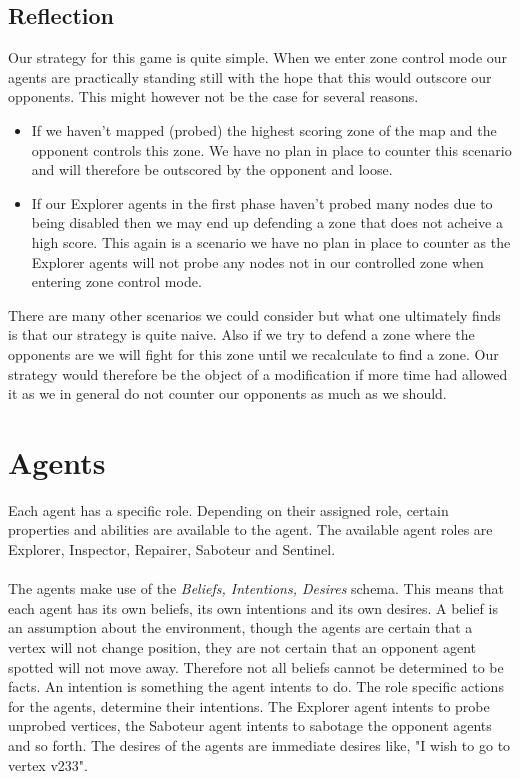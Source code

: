 \documentclass[11pt]{article}
\begin{document}
\subsection{Reflection}
Our strategy for this game is quite simple. When we enter zone control mode our agents are practically standing still with the hope that this would outscore our opponents. This might however not be the case for several reasons.
\begin{itemize}
\item If we haven't mapped (probed) the highest scoring zone of the map and the opponent controls this zone. We have no plan in place to counter this scenario and will therefore be outscored by the opponent and loose.
\item If our Explorer agents in the first phase haven't probed many nodes due to being disabled then we may end up defending a zone that does not acheive a high score. This again is a scenario we have no plan in place to counter as the Explorer agents will not probe any nodes not in our controlled zone when entering zone control mode.
\end{itemize}
There are many other scenarios we could consider but what one ultimately finds is that our strategy is quite naive. Also if we try to defend a zone where the opponents are we will fight for this zone until we recalculate to find a zone. Our strategy would therefore be the object of a modification if more time had allowed it as we in general do not counter our opponents as much as we should.

\section{Agents}
Each agent has a specific role. Depending on their assigned role, certain properties and abilities are available to the agent. The available agent roles are Explorer, Inspector, Repairer, Saboteur and Sentinel.\\
\\
The agents make use of the \emph{Beliefs, Intentions, Desires} schema. This means that each agent has its own beliefs, its own intentions and its own desires. A belief is an assumption about the environment, though the agents are certain that a vertex will not change position, they are not certain that an opponent agent spotted will not move away. Therefore not all beliefs cannot be determined to be facts. An intention is something the agent intents to do. The role specific actions for the agents, determine their intentions. The Explorer agent intents to probe unprobed vertices, the Saboteur agent intents to sabotage the opponent agents and so forth. The desires of the agents are immediate desires like, "I wish to go to vertex v233".
\end{document}

